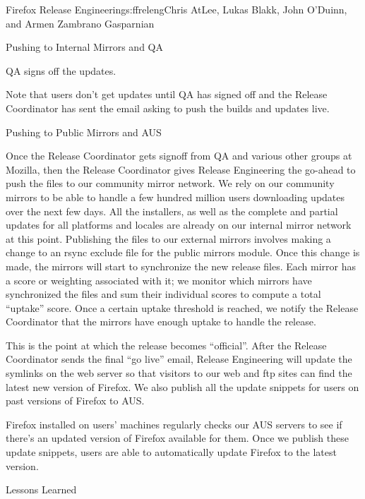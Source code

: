 \begin{aosachapter}{Firefox Release Engineering}{s:ffreleng}{Chris AtLee, Lukas Blakk, John O'Duinn, and Armen Zambrano Gasparnian}
\begin{aosasect1}{Pushing to Internal Mirrors and QA}
\begin{aosaitemize}
\item QA signs off the updates.

\end{aosaitemize}
  
Note that users don't get updates until QA has signed off and the
Release Coordinator has sent the email asking to push the builds and
updates live.
 
\end{aosasect1}

\begin{aosasect1}{Pushing to Public Mirrors and AUS}

Once the Release Coordinator gets signoff from QA and various
other groups at Mozilla, then the Release Coordinator gives
Release Engineering the go-ahead to push the files to our
community mirror network. We rely on our community mirrors to be
able to handle a few hundred million users downloading updates
over the next few days. All the installers, as well as the complete 
and partial updates for all platforms and locales are already on our
internal mirror network at this point. Publishing the files to
our external mirrors involves making a change to an rsync exclude file
for the public mirrors module.  Once this change is made, the
mirrors will start to synchronize the new release files. Each     
mirror has a score or weighting associated with it; we monitor which mirrors have
synchronized the files and sum their individual scores to compute a
total ``uptake'' score. Once a certain uptake threshold is reached, we notify
the Release Coordinator that the mirrors have enough uptake to handle
the release.

This is the point at which the release becomes ``official''. After the
Release Coordinator sends the final ``go live'' email, Release
Engineering will update the symlinks on the web server so that
visitors to our web and ftp sites can find the latest new version of
Firefox. We also publish all the update snippets for users on past versions of
Firefox to AUS. 

Firefox installed on users' machines regularly checks our AUS
servers to see if there's an updated version of Firefox available for
them. Once we publish these update snippets, users are able to
automatically update Firefox to the latest version.
  
\end{aosasect1}

\begin{aosasect1}{Lessons Learned}


\end{aosasect1}
\end{aosachapter}
